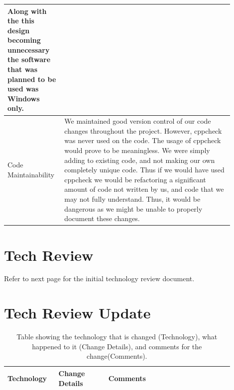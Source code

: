 \documentclass[10pt,journal,compsoc,draftclsnofoot]{IEEEtran}
\begin{document}
\begin{flushleft}
\begin{center}
\begin{table}[H]
\begin{tabular}{ | p{0.2\linewidth} | p{0.7\linewidth} | }
Along with the this design becoming unnecessary the software that was planned to be used was Windows only. \\ \hline
Code Maintainability &
We maintained good version control of our code changes throughout the project.
However, cppcheck was never used on the code.
The usage of cppcheck would prove to be meaningless.
We were simply adding to existing code, and not making our own completely unique code.
Thus if we would have used cppcheck we would be refactoring a significant amount of code not written by us, and code that we may not fully understand.
Thus, it would be dangerous as we might be unable to properly document these changes. \\ \hline
\end{tabular}
\newline
\label{table:DesignDocumentUpdate}
\end{table}
\end{center}

\newpage

\section{Tech Review}

Refer to next page for the initial technology review document.

\newpage



\section{Tech Review Update}

\begin{center}
\begin{table}[H]
\caption{Table showing the technology that is changed (Technology), what happened to it (Change Details), and comments for the change(Comments).}
\begin{tabular}{ | p{0.2\linewidth} | p{0.2\linewidth} | p{0.5\linewidth} | }
\hline
\textbf{Technology}  & \textbf{Change Details}  & \textbf{Comments} \\ \hline


\end{tabular}
\end{table}
\end{center}
\end{flushleft}
\end{document}
